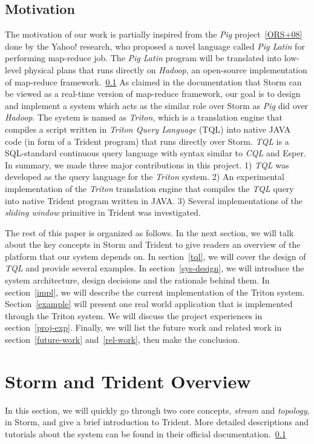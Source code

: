 \documentclass[conference, twocolumn, twoside, 11pt]{IEEEtran}
\theoremstyle{definition}
\begin{document}
\subsection{Motivation}
The motivation of our work is partially inspired from the \emph{Pig} project~\ref{ORS+08} done by the Yahoo! research, who proposed a novel language called \emph{Pig Latin} for performing map-reduce job. The \emph{Pig Latin} program will be translated into low-level physical plans that runs directly on \emph{Hadoop}, an open-source implementation of map-reduce framework.~\ref{} As claimed in the documentation that Storm can be viewed as a real-time version of map-reduce framework, our goal is to design and implement a system which acts as the similar role over Storm as \emph{Pig} did over \emph{Hadoop}. The system is named as \emph{Triton}, which is a translation engine that compiles a script written in \emph{Triton Query Language} (TQL) into native JAVA code (in form of a Trident program) that runs directly over Storm. \emph{TQL} is a SQL-standard continuous query language with syntax similar to \emph{CQL} and Esper.
In summary, we made three major contributions in this project. 1) \emph{TQL} was developed as the query language for the \emph{Triton} system. 2) An experimental implementation of the \emph{Triton} translation engine that compiles the \emph{TQL} query into native Trident program written in JAVA. 3) Several implementations of the \emph{sliding window} primitive in Trident was investigated.

The rest of this paper is organized as follows. In the next section, we will talk about the key concepts in Storm and Trident to give readers an overview of the platform that our system depends on. In section~\ref{tql}, we will cover the design of \emph{TQL} and provide several examples. In section~\ref{sys-design}, we will introduce the system architecture, design decisions and the rationale behind them.
In section~\ref{impl}, we will describe the current implementation of the Triton system. Section~\ref{example} will present one real world application that is implemented through the Triton system. We will discuss the project experiences in section~\ref{proj-exp}.
Finally, we will list the future work and related work in section~\ref{future-work} and~\ref{rel-work}, then make the conclusion.

\section{Storm and Trident Overview}\label{storm-trident}
In this section, we will quickly go through two core concepts, \emph{stream} and \emph{topology}, in Storm, and give a brief introduction to Trident. More detailed descriptions and tutorials about the system can be found in their official documentation.~\ref{}
\end{document}
